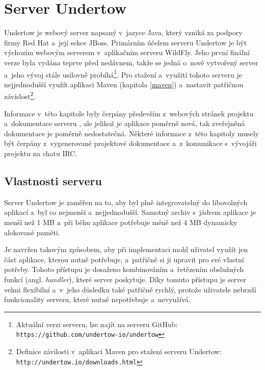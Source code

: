    \section{Server Undertow} \label{undertow}
        Undertow je webový server napsaný v~jazyce Java, 
        který vzniká za podpory firmy Red Hat a~její sekce JBoss.
        Primárním účelem serveru Undertow je být výchozím webovým serverem v~aplikačním serveru WildFly.
        Jeho první finální verze byla vydána teprve před nedávnem, takže se jedná
        o~nově vytvořený server a~jeho vývoj stále usilovně 
        probíhá\footnote{Aktuální verzi serveru, lze najít na serveru GitHub: 
        \texttt{https://github.com/undertow-io/undertow}}. Pro stažení a~využití tohoto serveru
        je nejjednodušší využít aplikaci Maven (kapitola \ref{maven}) a~nastavit patřičnou 
        závislost\footnote{Definice závilosti v~aplikaci Maven pro stažení serveru Undertow: 
        \texttt{http://undertow.io/downloads.html} }.

        Informace v~této kapitole byly čerpány především z~webových stránek projektu \cite{undertowWeb}
        a~dokumentace serveru \cite{undertowDocs},
        ale jelikož je aplikace poměrně nová, tak zveřejněná dokumentace je poměrně nedostatečná. 
        Některé informace z~této kapitoly musely být čerpány
        z~vygenerované projektové dokumentace a~z~komunikace s~vývojáři projektu
        na chatu IRC.

        \subsection{Vlastnosti serveru}
            Server Undertow je zaměřen na to, aby byl plně integrovatelný do libovolných aplikací
            a~byl co nejmenší a~nejjednodušší. Samotný
            archiv s~jádrem aplikace je menší než 1 MB a~při běhu aplikace potřebuje
            méně než 4 MB dynamicky alokované paměti. 

            Je navržen takovým způsobem, aby při implementaci mohl uživatel využít
            jen část aplikace, kterou nutně potřebuje, a~patřičně si ji upravit
            pro své vlastní potřeby.
            Tohoto přístupu je dosaženo kombinováním a~řetězením
            obslužných funkcí (angl. \emph{handler}), které server poskytuje.
            Díky tomuto přístupu je server velmi flexibilní a~v~jeho důsledku
            také patřičně rychlý, protože uživatele nebrzdí funkcionality
            serveru, které nutně nepotřebuje a~nevyužívá.
            
